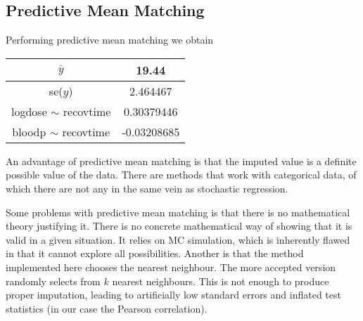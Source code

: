 \documentclass[11pt]{article}
\begin{document}
\subsection*{Predictive Mean Matching}

Performing predictive mean matching we obtain 

\begin{table}[H]
	\centering
	\begin{tabular}{|c|c|}
		\hline 
		$\bar{y}$ & 19.44\\ 
		\hline 
		se($y$) & 2.464467\\ 
		\hline 
		logdose $\sim$ recovtime & 0.30379446\\ 
		\hline 
		bloodp $\sim$ recovtime & -0.03208685\\ 
		\hline 
	\end{tabular} 
\end{table}

An advantage of predictive mean matching is that the imputed value is a definite possible value of the data. There are methods that work with categorical data, of which there are not any in the same vein as stochastic regression. 

Some problems with predictive mean matching is that there is no mathematical theory justifying it. There is no concrete mathematical way of showing that it is valid in a given situation. It relies on MC simulation, which is inherently flawed in that it cannot explore all possibilities. Another is that the method implemented here chooses the nearest neighbour. The more accepted version randomly selects from $k$ nearest neighbours. This is not enough to produce proper imputation, leading to artificially low standard errors and inflated test statistics (in our case the Pearson correlation). 
\end{document}
